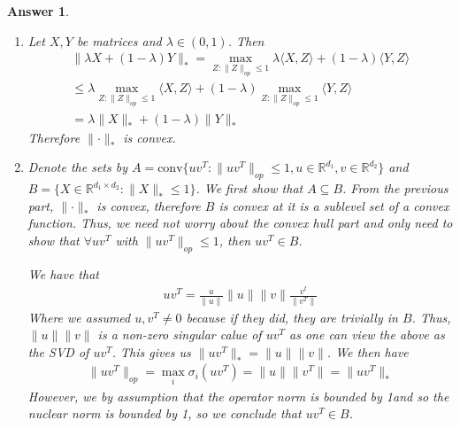 \documentclass[12pt]{article}
\theoremstyle{colon}
\newtheorem*{answer}{Answer}
\begin{document}
\begin{answer}
\begin{enumerate}[label=\arabic*)]
\begin{enumerate}[label=\alph*)]
        \item Let $X, Y$ be matrices and $\lambda \in (0,1)$. Then
          \begin{gather*}
            \lVert \lambda X + (1-\lambda) Y \rVert_* = \max_{Z : \lVert Z \rVert_{op} \leq 1} \lambda \langle X, Z \rangle + (1-\lambda) \langle Y, Z \rangle \\
            \leq \lambda \max_{Z : \lVert Z \rVert_{op} \leq 1} \langle X, Z \rangle + (1-\lambda) \max_{Z : \lVert Z \rVert_{op} \leq 1} \langle Y, Z \rangle \\
            = \lambda \lVert X \rVert_* + (1-\lambda) \lVert Y \rVert_*
          \end{gather*}
          Therefore $\lVert \cdot \rVert_*$ is convex.

        \item Denote the sets by $A = \text{conv}\{ u v^T : \lVert u v^T \rVert_{op} \leq 1, u \in \mathbb{R}^{d_1}, v \in \mathbb{R}^{d_2} \}$ and $B = \{ X \in \mathbb{R}^{d_1 \times d_2}  : \lVert X \rVert_* \leq 1 \}$. We first show that $A \subseteq B$. From the previous part, $\lVert \cdot \rVert_*$ is convex, therefore $B$ is convex at it is a sublevel set of a convex function. Thus, we need not worry about the convex hull part and only need to show that $\forall u v^T$ with $\lVert u v^T \rVert_{op} \leq 1$, then $u v^T \in B$.

          We have that
          \begin{gather*}
            u v^T = \frac{u}{\lVert u \rVert} \lVert u \rVert \lVert v \rVert \frac{v^t}{\lVert v^T \rVert}
          \end{gather*}
          Where we assumed $u, v^T \neq 0$ because if they did, they are trivially in $B$. Thus, $\lVert u \rVert \lVert v \rVert$ is a non-zero singular calue of $u v^T$ as one can view the above as the SVD of $u v^T$. This gives us $\lVert u v^T \rVert_* = \lVert u \rVert \lVert v \rVert$. We then have
          \begin{gather*}
            \lVert u v^T \rVert_{op} = \max_i \sigma_i(u v^T) = \lVert u \rVert \lVert v^T \rVert = \lVert u v^T \rVert_*
          \end{gather*}
          However, we by assumption that the operator norm is bounded by 1and so the nuclear norm is bounded by 1, so we conclude that $u v^T \in B$.


\end{enumerate}
\end{enumerate}
\end{answer}
\end{document}
